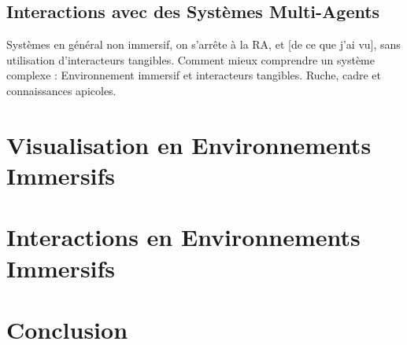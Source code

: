 		
		\subsection{Interactions avec des Systèmes Multi-Agents}
		Systèmes en général non immersif, on s'arrête à la RA, et [de ce que j'ai vu], sans utilisation d'interacteurs tangibles.
	Comment mieux comprendre un système complexe : Environnement immersif et interacteurs tangibles. Ruche, cadre et connaissances apicoles.
	\section{Visualisation en Environnements Immersifs}
	\section{Interactions en Environnements Immersifs}			
	\section*{Conclusion}
